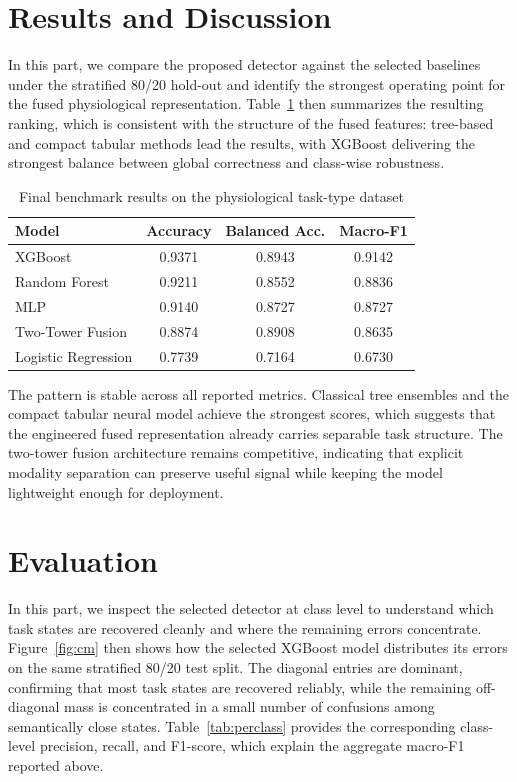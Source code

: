 \documentclass{llncs}
\begin{document}
\section{Results and Discussion}
In this part, we compare the proposed detector against the selected baselines under the stratified 80/20 hold-out and identify the strongest operating point for the fused physiological representation. Table~\ref{tab:results} then summarizes the resulting ranking, which is consistent with the structure of the fused features: tree-based and compact tabular methods lead the results, with \acs{XGBoost} delivering the strongest balance between global correctness and class-wise robustness.
\begin{table}[!h]
\caption{Final benchmark results on the physiological task-type dataset}
\label{tab:results}
\centering
\begin{tabular}{lccc}
\hline
Model & Accuracy & Balanced Acc. & Macro-F1 \\
\hline
\acs{XGBoost} & 0.9371 & 0.8943 & 0.9142 \\
Random Forest & 0.9211 & 0.8552 & 0.8836 \\
\acs{MLP} & 0.9140 & 0.8727 & 0.8727 \\
Two-Tower Fusion & 0.8874 & 0.8908 & 0.8635 \\
Logistic Regression & 0.7739 & 0.7164 & 0.6730 \\
\hline
\end{tabular}
\end{table}

The pattern is stable across all reported metrics. Classical tree ensembles and the compact tabular neural model achieve the strongest scores, which suggests that the engineered fused representation already carries separable task structure. The two-tower fusion architecture remains competitive, indicating that explicit modality separation can preserve useful signal while keeping the model lightweight enough for deployment.

\section{Evaluation}
In this part, we inspect the selected detector at class level to understand which task states are recovered cleanly and where the remaining errors concentrate. 
Figure~\ref{fig:cm} then shows how the selected \acs{XGBoost} model distributes its errors on the same stratified 80/20 test split. The diagonal entries are dominant, confirming that most task states are recovered reliably, while the remaining off-diagonal mass is concentrated in a small number of confusions among semantically close states. Table~\ref{tab:perclass} provides the corresponding class-level precision, recall, and F1-score, which explain the aggregate macro-F1 reported above.
\end{document}
